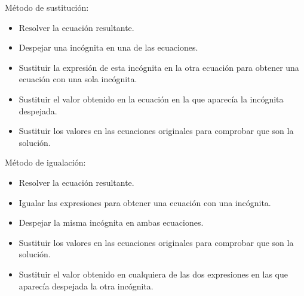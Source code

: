\documentclass[12pt,addpoints]{evalua}
\begin{document}
\begin{questions}
{\begin{choices}
                  \choice M\'etodo de sustitución:
                  \begin{itemize}
                        \item[\rule{1cm}{0.2mm}] Resolver la ecuaci\'on resultante.
                        \item[\rule{1cm}{0.2mm}] Despejar una inc\'ognita en una de las ecuaciones.
                        \item[\rule{1cm}{0.2mm}] Sustituir la expresi\'on de esta inc\'ognita en la otra ecuaci\'on para obtener una ecuaci\'on con una sola inc\'ognita.
                        \item[\rule{1cm}{0.2mm}] Sustituir el valor obtenido en la ecuaci\'on en la que aparec\'ia la inc\'ognita despejada.
                        \item[\rule{1cm}{0.2mm}] Sustituir los valores en las ecuaciones originales para comprobar que son la soluci\'on.
                  \end{itemize}

                  \choice M\'etodo de igualaci\'on:
                  \begin{itemize}
                        \item[\rule{1cm}{0.2mm}] Resolver la ecuaci\'on resultante.
                        \item[\rule{1cm}{0.2mm}] Igualar las expresiones para obtener una ecuaci\'on con una inc\'ognita.
                        \item[\rule{1cm}{0.2mm}] Despejar la misma inc\'ognita en ambas ecuaciones.
                        \item[\rule{1cm}{0.2mm}] Sustituir los valores en las ecuaciones originales para comprobar que son la soluci\'on.
                        \item[\rule{1cm}{0.2mm}] Sustituir el valor obtenido en cualquiera de las dos expresiones en las que aparec\'ia despejada la otra inc\'ognita.
                  \end{itemize}
            \end{choices}
      }


\end{questions}
\end{document}
